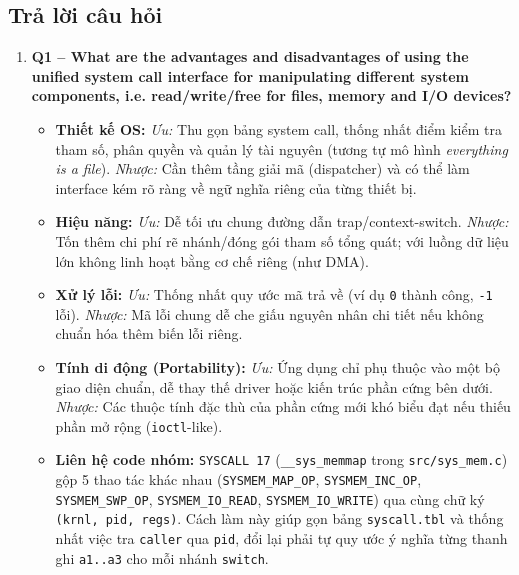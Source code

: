 \documentclass[12pt,a4paper]{article}
\begin{document}
	\subsection{Trả lời câu hỏi}
	\begin{enumerate}
	    \item \textbf{Q1 -- What are the advantages and disadvantages of using the unified system call interface for manipulating different system components, i.e. read/write/free for files, memory and I/O devices?}

	    \begin{itemize}[leftmargin=*]
	        \item \textbf{Thiết kế OS:} \textit{Ưu:} Thu gọn bảng system call, thống nhất điểm kiểm tra tham số, phân quyền và quản lý tài nguyên (tương tự mô hình \textit{everything is a file}). \textit{Nhược:} Cần thêm tầng giải mã (dispatcher) và có thể làm interface kém rõ ràng về ngữ nghĩa riêng của từng thiết bị.
	        \item \textbf{Hiệu năng:} \textit{Ưu:} Dễ tối ưu chung đường dẫn trap/context-switch. \textit{Nhược:} Tốn thêm chi phí rẽ nhánh/đóng gói tham số tổng quát; với luồng dữ liệu lớn không linh hoạt bằng cơ chế riêng (như DMA).
	        \item \textbf{Xử lý lỗi:} \textit{Ưu:} Thống nhất quy ước mã trả về (ví dụ \texttt{0} thành công, \texttt{-1} lỗi). \textit{Nhược:} Mã lỗi chung dễ che giấu nguyên nhân chi tiết nếu không chuẩn hóa thêm biến lỗi riêng.
	        \item \textbf{Tính di động (Portability):} \textit{Ưu:} Ứng dụng chỉ phụ thuộc vào một bộ giao diện chuẩn, dễ thay thế driver hoặc kiến trúc phần cứng bên dưới. \textit{Nhược:} Các thuộc tính đặc thù của phần cứng mới khó biểu đạt nếu thiếu phần mở rộng (\texttt{ioctl}-like).
	        \item \textbf{Liên hệ code nhóm:} \texttt{SYSCALL 17} (\texttt{\_\_sys\_memmap} trong \texttt{src/sys\_mem.c}) gộp 5 thao tác khác nhau (\texttt{SYSMEM\_MAP\_OP}, \texttt{SYSMEM\_INC\_OP}, \texttt{SYSMEM\_SWP\_OP}, \texttt{SYSMEM\_IO\_READ}, \texttt{SYSMEM\_IO\_WRITE}) qua cùng chữ ký \texttt{(krnl, pid, regs)}. Cách làm này giúp gọn bảng \texttt{syscall.tbl} và thống nhất việc tra \texttt{caller} qua \texttt{pid}, đổi lại phải tự quy ước ý nghĩa từng thanh ghi \texttt{a1..a3} cho mỗi nhánh \texttt{switch}.
	    \end{itemize}
	\end{enumerate}
	\endgroup

\end{document}
